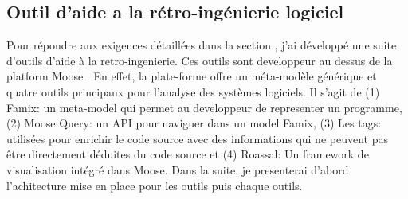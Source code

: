 \documentclass[a4paper]{article}
\begin{document}
\subsection{Outil d'aide a la rétro-ingénierie logiciel}
Pour répondre aux exigences détaillées dans la section , j'ai développé une suite d'outils d'aide à la retro-ingenierie.
Ces outils sont developpeur au dessus de la platform Moose \cite{Nier05c}.
En effet, la plate-forme offre un méta-modèle générique et quatre outils principaux pour l'analyse des systèmes logiciels.
Il s'agit de (1) Famix: un meta-model qui permet au developpeur de representer un programme, (2) Moose Query: un API pour naviguer dans un model Famix,
(3) Les tags: utilisées pour enrichir le code source avec des informations qui ne peuvent pas être directement déduites du code source et 
(4) Roassal: Un framework de visualisation intégré dans Moose.
Dans la suite, je presenterai d'abord l'achitecture mise en place pour les outils puis  chaque outils.
\end{document}
